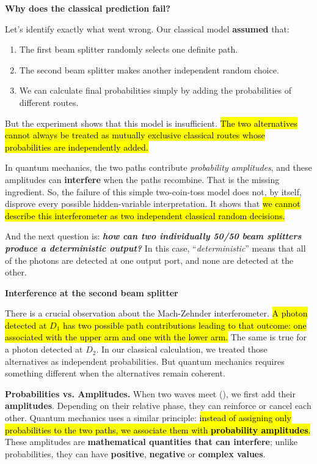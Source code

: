 \highspace
\begin{flushleft}
    \textcolor{Green3}{ \textbf{Why does the classical prediction fail?}}
\end{flushleft}
Let's identify exactly what went wrong. Our classical model \textbf{assumed} that:
\begin{enumerate}
    \item The first beam splitter randomly selects one definite path.
    \item The second beam splitter makes another independent random choice.
    \item We can calculate final probabilities simply by adding the probabilities of different routes.
\end{enumerate}
But the experiment shows that this model is insufficient. \hl{The two alternatives cannot always be treated as mutually exclusive classical routes whose probabilities are independently added.}

\highspace
In quantum mechanics, the two paths contribute \emph{probability amplitudes}, and these amplitudes can \textbf{interfere} when the paths recombine. That is the missing ingredient. So, the failure of this simple two-coin-toss model does not, by itself, disprove every possible hidden-variable interpretation. It shows that \hl{we cannot describe this interferometer as two independent classical random decisions.}

\highspace
And the next question is: \emph{\textbf{how can two individually 50/50 beam splitters produce a deterministic output?}} In this case, ``\emph{deterministic}'' means that all of the photons are detected at one output port, and none are detected at the other.

\newpage

\begin{flushleft}
    \textcolor{Green3}{ \textbf{Interference at the second beam splitter}}
\end{flushleft}
There is a crucial observation about the Mach-Zehnder interferometer. \hl{A photon detected at $D_1$ has two possible path contributions leading to that outcome: one associated with the upper arm and one with the lower arm.} The same is true for a photon detected at $D_2$. In our classical calculation, we treated those alternatives as independent probabilities. But quantum mechanics requires something different when the alternatives remain coherent.

\highspace
\textcolor{Green3}{ \textbf{Probabilities vs. Amplitudes.}} When two waves meet (), we first add their \textbf{amplitudes}. Depending on their relative phase, they can reinforce or cancel each other. Quantum mechanics uses a similar principle: \hl{instead of assigning only probabilities to the two paths, we associate them with \textbf{probability amplitudes}.} These amplitudes are \textbf{mathematical quantities that can interfere}; unlike probabilities, they can have \textbf{positive}, \textbf{negative} or \textbf{complex values}.

